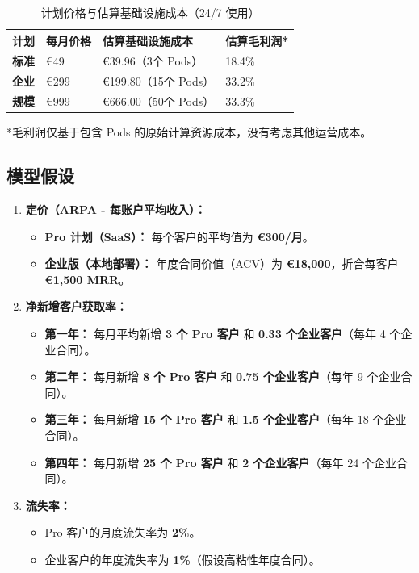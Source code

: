 \documentclass[11点, A4纸, 单面]{article}
\begin{document}
\begin{table}[H]
\centering
\caption{计划价格与估算基础设施成本（24/7 使用）}
\label{tab:cost_analysis}
\begin{tabularx}{\textwidth}{L X X X} 
\toprule
\textbf{计划} & \textbf{每月价格} & \textbf{估算基础设施成本} & \textbf{估算毛利润*} \\
\midrule
\textbf{标准} & \euro{49} & \euro{39.96}（3个 Pods） & 18.4\% \\
\addlinespace
\textbf{企业} & \euro{299} & \euro{199.80}（15个 Pods） & 33.2\% \\
\addlinespace
\textbf{规模} & \euro{999} & \euro{666.00}（50个 Pods） & 33.3\% \\
\bottomrule
\end{tabularx}
\raggedright
\footnotesize{*毛利润仅基于包含 Pods 的原始计算资源成本，没有考虑其他运营成本。}
\end{table}



\subsection{模型假设}
\begin{enumerate}
    \item \textbf{定价（ARPA - 每账户平均收入）：}
    \begin{itemize}
        \item \textbf{Pro 计划（SaaS）：} 每个客户的平均值为 \textbf{\euro{}300/月}。
        \item \textbf{企业版（本地部署）：} 年度合同价值（ACV）为 \textbf{\euro{}18,000}，折合每客户 \textbf{\euro{}1,500 MRR}。
    \end{itemize}

    \item \textbf{净新增客户获取率：}
    \begin{itemize}
        \item \textbf{第一年：} 每月平均新增 \textbf{3 个 Pro 客户} 和 \textbf{0.33 个企业客户}（每年 4 个企业合同）。
        \item \textbf{第二年：} 每月新增 \textbf{8 个 Pro 客户} 和 \textbf{0.75 个企业客户}（每年 9 个企业合同）。
        \item \textbf{第三年：} 每月新增 \textbf{15 个 Pro 客户} 和 \textbf{1.5 个企业客户}（每年 18 个企业合同）。
        \item \textbf{第四年：} 每月新增 \textbf{25 个 Pro 客户} 和 \textbf{2 个企业客户}（每年 24 个企业合同）。
    \end{itemize}

    \item \textbf{流失率：}
    \begin{itemize}
        \item Pro 客户的月度流失率为 \textbf{2\%}。
        \item 企业客户的年度流失率为 \textbf{1\%}（假设高粘性年度合同）。
    \end{itemize}
\end{enumerate}
\end{document}
